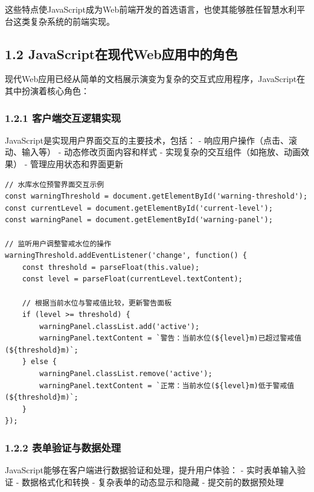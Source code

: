 这些特点使JavaScript成为Web前端开发的首选语言，也使其能够胜任智慧水利平台这类复杂系统的前端实现。

\subsection{1.2
JavaScript在现代Web应用中的角色}\label{javascriptux5728ux73b0ux4ee3webux5e94ux7528ux4e2dux7684ux89d2ux8272}

现代Web应用已经从简单的文档展示演变为复杂的交互式应用程序，JavaScript在其中扮演着核心角色：

\subsubsection{1.2.1
客户端交互逻辑实现}\label{ux5ba2ux6237ux7aefux4ea4ux4e92ux903bux8f91ux5b9eux73b0}

JavaScript是实现用户界面交互的主要技术，包括： -
响应用户操作（点击、滚动、输入等） - 动态修改页面内容和样式 -
实现复杂的交互组件（如拖放、动画效果） - 管理应用状态和界面更新

\begin{lstlisting}
// 水库水位预警界面交互示例
const warningThreshold = document.getElementById('warning-threshold');
const currentLevel = document.getElementById('current-level');
const warningPanel = document.getElementById('warning-panel');

// 监听用户调整警戒水位的操作
warningThreshold.addEventListener('change', function() {
    const threshold = parseFloat(this.value);
    const level = parseFloat(currentLevel.textContent);
    
    // 根据当前水位与警戒值比较，更新警告面板
    if (level >= threshold) {
        warningPanel.classList.add('active');
        warningPanel.textContent = `警告：当前水位(${level}m)已超过警戒值(${threshold}m)`;
    } else {
        warningPanel.classList.remove('active');
        warningPanel.textContent = `正常：当前水位(${level}m)低于警戒值(${threshold}m)`;
    }
});
\end{lstlisting}

\subsubsection{1.2.2
表单验证与数据处理}\label{ux8868ux5355ux9a8cux8bc1ux4e0eux6570ux636eux5904ux7406}

JavaScript能够在客户端进行数据验证和处理，提升用户体验： -
实时表单输入验证 - 数据格式化和转换 - 复杂表单的动态显示和隐藏 -
提交前的数据预处理

